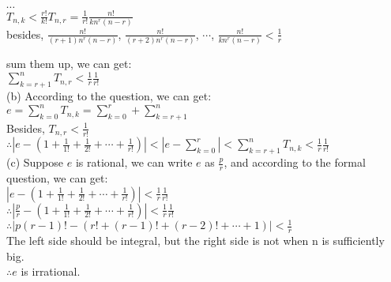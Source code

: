 \documentclass{article}
\begin{document}
\qquad\quad$\cdots$\\

\qquad\quad$\displaystyle T_{n,k}<\frac{r!}{k!}T_{n,r}=\frac{1}{r!}\frac{n!}{kn^r(n-r)}$\\

\qquad\quad besides, $\displaystyle\frac{n!}{(r+1)n^r(n-r)}$, $\displaystyle\frac{n!}{(r+2)n^r(n-r)}$, $\cdots$, $\displaystyle\frac{n!}{kn^r(n-r)}<\frac{1}{r}$

\qquad\quad sum them up, we can get:\\

\qquad\quad $\displaystyle\sum_{k=r+1}^{n}T_{n,r}<\frac{1}{r}\frac{1}{r!}$\\

(b) According to the question, we can get:\\

$e=\sum_{k=0}^{n}T_{n,k}=\sum_{k=0}^{r}+\sum_{k=r+1}^{n}$\\

Besides, $T_{n,r}<\frac{1}{r!}$\\

$\therefore$\qquad$\left|e-\left(1+\frac{1}{1!}+\frac{1}{2!}+\cdots+\frac{1}{r!}\right)\right|<\left|e-\sum_{k=0}^{r}\right|<\sum_{k=r+1}^{n}T_{n,k}<\frac{1}{r}\frac{1}{r!}$\\

(c) Suppose $e$ is rational, we can write $e$ as $\frac{p}{r}$, and according to the formal question, we can get:\\

$\left|e-\left(1+\frac{1}{1!}+\frac{1}{2!}+\cdots+\frac{1}{r!}\right)\right|<\frac{1}{r}\frac{1}{r!}$\\

$\therefore$\qquad$\left|\frac{p}{r}-\left(1+\frac{1}{1!}+\frac{1}{2!}+\cdots+\frac{1}{r!}\right)\right|<\frac{1}{r}\frac{1}{r!}$\\

$\therefore$\qquad$\left|p(r-1)!-\left(r!+(r-1)!+(r-2)!+\cdots+1\right)\right|<\frac{1}{r}$\\

The left side should be integral, but the right side is not when n is sufficiently big.\\

$\therefore$\qquad$e$ is irrational.\\
\end{document}
